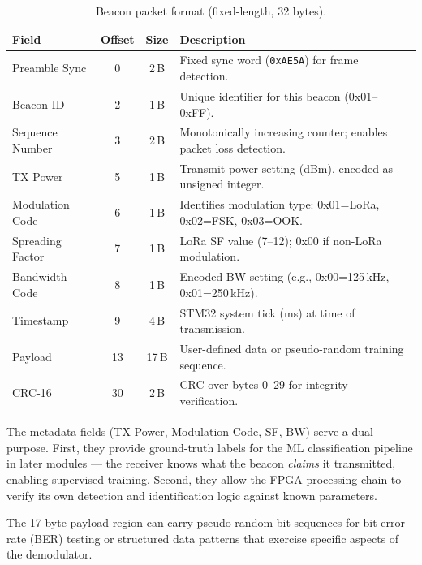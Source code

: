 \documentclass[11pt,letterpaper]{article}
\begin{document}
	\begin{table}[ht!]
		\centering
		\caption{Beacon packet format (fixed-length, 32 bytes).}
		\label{tab:packet}
		\renewcommand{\arraystretch}{1.3}
		\begin{tabularx}{\textwidth}{l c c X}
			\toprule
			\textbf{Field} & \textbf{Offset} & \textbf{Size} & \textbf{Description} \\
			\midrule
			Preamble Sync & 0 & 2\,B & Fixed sync word (\texttt{0xAE5A}) for frame detection. \\
			Beacon ID & 2 & 1\,B & Unique identifier for this beacon (0x01--0xFF). \\
			Sequence Number & 3 & 2\,B & Monotonically increasing counter; enables packet loss detection. \\
			TX Power & 5 & 1\,B & Transmit power setting (dBm), encoded as unsigned integer. \\
			Modulation Code & 6 & 1\,B & Identifies modulation type: 0x01=LoRa, 0x02=FSK, 0x03=OOK. \\
			Spreading Factor & 7 & 1\,B & LoRa SF value (7--12); 0x00 if non-LoRa modulation. \\
			Bandwidth Code & 8 & 1\,B & Encoded BW setting (e.g., 0x00=125\,kHz, 0x01=250\,kHz). \\
			Timestamp & 9 & 4\,B & STM32 system tick (ms) at time of transmission. \\
			Payload & 13 & 17\,B & User-defined data or pseudo-random training sequence. \\
			CRC-16 & 30 & 2\,B & CRC over bytes 0--29 for integrity verification. \\
			\bottomrule
		\end{tabularx}
	\end{table}
	
	\begin{tcolorbox}[infobox={Design Rationale: Why These Fields?}]
		The metadata fields (TX Power, Modulation Code, SF, BW) serve a dual purpose. First, they provide ground-truth labels for the ML classification pipeline in later modules --- the receiver knows what the beacon \emph{claims} it transmitted, enabling supervised training. Second, they allow the FPGA processing chain to verify its own detection and identification logic against known parameters.
		
		The 17-byte payload region can carry pseudo-random bit sequences for bit-error-rate (BER) testing or structured data patterns that exercise specific aspects of the demodulator.
	\end{tcolorbox}
	
\end{document}
